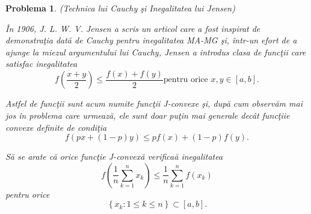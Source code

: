 \documentclass[a4paper,12pt,oneside]{report}
\newtheorem{problem}{Problema}
\begin{document}
\begin{problem} (Technica lui Cauchy \c{s}i Inegalitatea lui Jensen)

\^{I}n 1906, J. L. W. V. Jensen a scris un articol care a fost inspirat de demonstra\c{t}ia dat\u{a} de Cauchy pentru inegalitatea MA-MG \c{s}i, \^{i}ntr-un efort de a ajunge la miezul argumentului lui Cauchy, Jensen a introdus clasa de func\c{t}ii care satisfac inegalitatea
\begin{displaymath}
  f\left ( \frac{x + y}{2} \right ) \leq \frac{f\left ( x \right ) + f\left ( y \right )}{2} \text{pentru orice } x,y \in \left [ a, b \right ]. \label{eq:2.14} \tag{2.14}
\end{displaymath}

Astfel de func\c{t}ii sunt acum numite func\c{t}ii J-convexe \c{s}i, dup\u{a} cum observ\u{a}m mai jos \^{i}n problema care urmeaz\u{a}, ele sunt doar pu\c{t}in mai generale dec\^{a}t func\c{t}iie convexe definite de condi\c{t}ia
\begin{displaymath}
  f\left ( px + \left ( 1 - p \right )y \right )\leq pf\left ( x \right ) + \left ( 1-p \right )f\left ( y \right ).
\end{displaymath}

S\u{a} se arate c\u{a} orice func\c{t}ie  J-convex\u{a} verifica\u{a} inegalitatea
\begin{displaymath}
  f\left ( \frac{1}{n} \sum_{k = 1}^{n}x_{k}\right )\leq \frac{1}{n}\sum_{k = 1}^{n}f\left ( x_{k} \right )
\end{displaymath}
pentru orice
\begin{displaymath}
  \left \{ x_{k}: 1\leq k \leq n \right \} \subset \left [ a, b \right ]. \label{eq:2.15} \tag{2.15}
\end{displaymath}
\end{problem}
\end{document}
